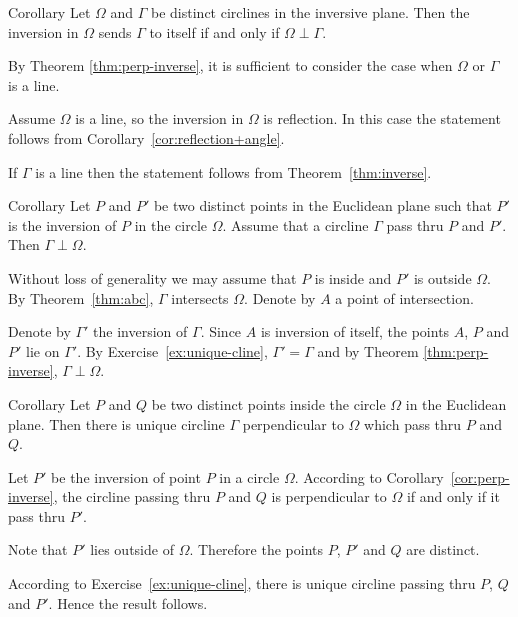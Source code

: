 \begin{thm}{Corollary}\label{cor:perp-inverse-clines}
Let $\Omega$  and $\Gamma$ be distinct circlines in the inversive plane.
Then
the inversion in $\Omega$ sends $\Gamma$ to itself if and only if $\Omega\perp\Gamma$.
\end{thm}

By Theorem \ref{thm:perp-inverse}, it is sufficient to consider the case when $\Omega$ or $\Gamma$ is a line.

Assume $\Omega$ is a line, so the inversion in $\Omega$ is reflection.
In this case the statement follows from Corollary~\ref{cor:reflection+angle}.

If $\Gamma$ is a line then the statement follows from 
Theorem~\ref{thm:inverse}.
\qeds


\begin{thm}{Corollary}\label{cor:perp-inverse}
Let $P$ and $P'$ be two distinct points  in the Euclidean plane
such that $P'$ is the inversion of $P$ in the circle $\Omega$.
Assume that a circline $\Gamma$ pass thru $P$ and $P'$.
Then $\Gamma\perp\Omega$.
\end{thm}

Without loss of generality we may assume that $P$ is inside and $P'$ is outside $\Omega$.
By Theorem~\ref{thm:abc}, $\Gamma$ intersects $\Omega$.
Denote by $A$ a point of intersection.


Denote by $\Gamma'$ the inversion of $\Gamma$.
Since $A$ is inversion of itself, the points $A$, $P$ and $P'$ lie on  $\Gamma'$.
By Exercise~\ref{ex:unique-cline},
$\Gamma'=\Gamma$
and
by Theorem \ref{thm:perp-inverse}, $\Gamma\perp\Omega$.
\qeds

\begin{thm}{Corollary}\label{cor:h-line} Let $P$ and $Q$ be two distinct points inside the circle $\Omega$ in the Euclidean plane.
Then there is unique circline $\Gamma$ perpendicular to $\Omega$ which pass thru $P$ and $Q$.  
\end{thm}

Let $P'$ be the inversion of point $P$ in a circle $\Omega$.
According to Corollary~\ref{cor:perp-inverse},
the circline passing thru $P$ and $Q$ 
is perpendicular to $\Omega$ if and only if it pass thru $P'$.

Note that $P'$ lies outside of $\Omega$.
Therefore the points $P$, $P'$ and $Q$ are distinct.

According to Exercise~\ref{ex:unique-cline},
there is unique circline passing thru $P$, $Q$ and $P'$.
Hence the result follows.
\qeds


